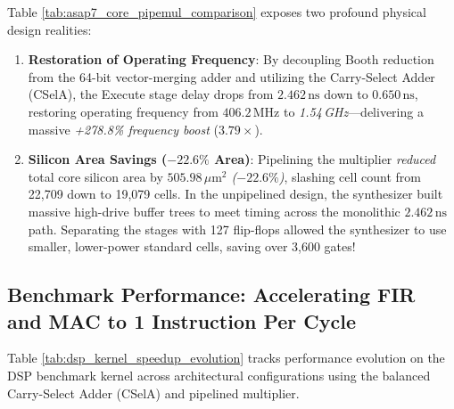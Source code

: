 Table \ref{tab:asap7_core_pipemul_comparison} exposes two profound physical design realities:
\begin{enumerate}
    \item \textbf{Restoration of Operating Frequency}:
    By decoupling Booth reduction from the 64-bit vector-merging adder and utilizing the Carry-Select Adder (CSelA), the Execute stage delay drops from $2.462\,\text{ns}$ down to $0.650\,\text{ns}$, restoring operating frequency from $406.2\,\text{MHz}$ to \textit{1.54\,GHz}---delivering a massive \textit{+278.8\% frequency boost} ($3.79\times$).
    
    \item \textbf{Silicon Area Savings ($-22.6\%$ Area)}:
    Pipelining the multiplier \textit{reduced} total core silicon area by \textit{$505.98\,\mu\text{m}^2$ ($-22.6\%$)}, slashing cell count from 22,709 down to 19,079 cells. In the unpipelined design, the synthesizer built massive high-drive buffer trees to meet timing across the monolithic $2.462\,\text{ns}$ path. Separating the stages with 127 flip-flops allowed the synthesizer to use smaller, lower-power standard cells, saving over 3,600 gates!
\end{enumerate}

\subsection{Benchmark Performance: Accelerating FIR and MAC to 1 Instruction Per Cycle}

Table \ref{tab:dsp_kernel_speedup_evolution} tracks performance evolution on the DSP benchmark kernel across architectural configurations using the balanced Carry-Select Adder (CSelA) and pipelined multiplier.

